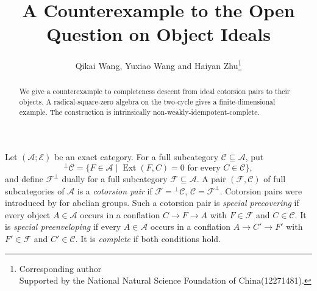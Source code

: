 \documentclass[10pt]{article}
\title{A Counterexample to the Open Question on Object Ideals}
\author{Qikai Wang, Yuxiao Wang and Haiyan Zhu\thanks{Corresponding author\\  Supported by the National Natural Science Foundation of China(12271481).}}
\date{}
\theoremstyle{remark}\newtheorem{remark}[theorem]{Remark}
\newcommand{\Ob}{\operatorname{Ob}}
\newcommand{\Proj}{\operatorname{Proj}}
\begin{document}
\maketitle
\begin{abstract} 
We give a counterexample to completeness descent from ideal cotorsion pairs to their objects.  
A radical-square-zero algebra on the two-cycle gives a finite-dimensional example.  The construction is intrinsically non-weakly-idempotent-complete.
\end{abstract}
 
Let \((\mathcal A;\mathcal E)\) be an exact category. 
For a full subcategory \(\mathcal C\subseteq\mathcal A\), put
\[
 {}^{\perp}\mathcal C
 =\{F\in\mathcal A\mid
     \operatorname{Ext}(F,C)=0\text{ for every }C\in\mathcal C\},
\]
and define \(\mathcal F^{\perp}\) dually for a full subcategory \(\mathcal F\subseteq\mathcal A\). A pair \((\mathcal F,\mathcal C)\)
of full subcategories of \(\mathcal A\) is a \emph{cotorsion pair} if $\mathcal F={}^{\perp}\mathcal C$, $\mathcal C=\mathcal F^{\perp}$.
Cotorsion pairs were introduced by \citep{Salce1979} for abelian groups.
Such a cotorsion pair is \emph{special precovering} if every object \(A\in\mathcal A\) occurs in a conflation $C\longrightarrow F\longrightarrow A$ with \(F\in\mathcal F\) and \(C\in\mathcal C\). 
It is \emph{special preenveloping} if every \(A\in\mathcal A\) occurs in a conflation $A\longrightarrow C'\longrightarrow F'$ with \(F'\in\mathcal F\) and \(C'\in\mathcal C\). 
It is \emph{complete} if both conditions hold.
\end{document}
